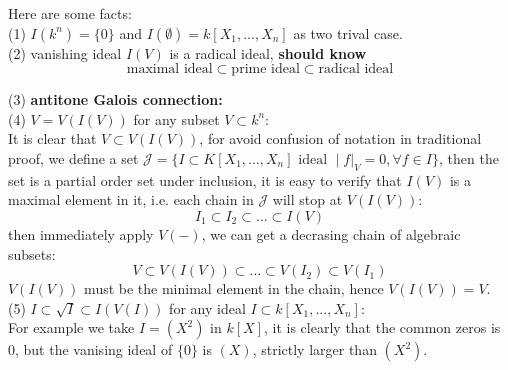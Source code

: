 \documentclass[12pt,a4paper]{article}
\begin{document}
\begin{remark}
    Here are some facts:\\

    (1) \(I(k^n) = \{0\}\) and \(I(\emptyset) = k[X_1,...,X_n]\) as two trival case.\\

    (2) vanishing ideal \(I(V)\) is a radical ideal, \textbf{should know}
    \[\text{maximal ideal} \subset \text{prime ideal} \subset \text{radical ideal}\]

    (3) \textbf{antitone Galois connection:}\\


    (4) \(V= V(I(V)) \) for any subset \(V \subset k^n\):\\

    It is clear that \(V \subset V(I(V))\), for avoid confusion of notation in traditional proof, we define a set \(\mathcal{J}=\{I \subset K[X_1,\dots,X_n] \text{ ideal } \mid f|_V = 0, \forall f \in I\}\), then the set is a partial order set under inclusion, it is easy to verify that \(I(V)\) is a maximal element in it, i.e. each chain in \(\mathcal{J}\) will stop at \(V(I(V))\):
    \[I_1 \subset I_2 \subset \dots \subset I(V)\]
    then immediately apply \(V(-)\), we can get a decrasing chain of algebraic subsets:
    \[V \subset V(I(V)) \subset \dots \subset V(I_2) \subset V(I_1)\]
    \(V(I(V))\) must be the minimal element in the chain, hence \(V(I(V)) = V\).\\

    (5) \(I \subset \sqrt{I} \subset I(V(I))\) for any ideal \(I \subset k[X_1,...,X_n]\):\\

    For example we take \(I = (X^2)\) in \(k[X]\), it is clearly that the common zeros is 0, but the vanising ideal of \(\{0\}\) is \((X)\), strictly larger than \((X^2)\).

\end{remark}
\end{document}
